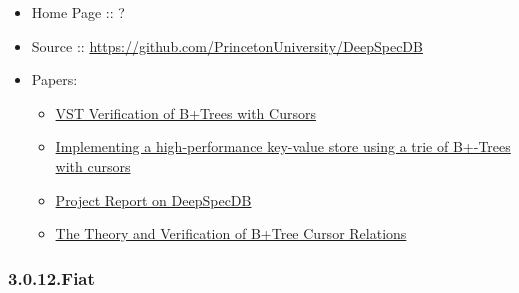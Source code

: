 \documentclass[12pt,twoside]{article}
\begin{document}
\begin{itemize}[noitemsep,topsep=\mdcompacttopsep]%

\item{}Home Page :: ?%

\item{}Source :: \href{https://github.com/PrincetonUniversity/DeepSpecDB}{{\ttfamily https://\hspace{0pt}github.\hspace{0pt}com/\hspace{0pt}PrincetonUniversity/\hspace{0pt}DeepSpecDB}}%

\item{}Papers:

\begin{itemize}[noitemsep,topsep=\mdcompacttopsep]%

\item{}\href{http://perso.eleves.ens-rennes.fr/people/Aurele.Barriere/papers/vstbtrees.pdf}{VST Verification of B+Trees with Cursors}%

\item{}\href{https://github.com/PrincetonUniversity/DeepSpecDB/blob/master/papers/adewale/Masters_Thesis.pdf}{Implementing a high-performance key-value store using a trie of B+-Trees with cursors}%

\item{}\href{https://github.com/PrincetonUniversity/DeepSpecDB/blob/master/papers/luke/report.pdf}{Project Report on DeepSpecDB}%

\item{}\href{https://github.com/PrincetonUniversity/DeepSpecDB/blob/master/papers/mcswiggen/McSwiggen-Thesis.pdf}{The Theory and Verification of B+Tree Cursor Relations}%
\end{itemize}%
\end{itemize}%

\subsubsection{3.0.12.\hspace*{0.5em}Fiat}\label{sec-fiat}%
\end{document}
